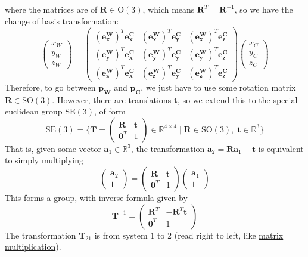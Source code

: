\documentclass{article}
\begin{document}
  where the matrices are of $\mathbf{R} \in \mathrm{O}(3)$, which means $\mathbf{R}^T = \mathbf{R}^{-1}$, so we have the change of basis transformation: 
  \begin{equation}
    \begin{pmatrix} x_W \\ y_W \\ z_W \end{pmatrix} = \begin{pmatrix} (\mathbf{e_x^W})^T \mathbf{e_x^C} & (\mathbf{e_x^W})^T \mathbf{e_y^C} & (\mathbf{e_x^W})^T \mathbf{e_z^C} \\
      (\mathbf{e_y^W})^T \mathbf{e_x^C} & (\mathbf{e_y^W})^T \mathbf{e_y^C} & (\mathbf{e_y^W})^T \mathbf{e_z^C} \\
      (\mathbf{e_z^W})^T \mathbf{e_x^C} & (\mathbf{e_z^W})^T \mathbf{e_y^C} & (\mathbf{e_z^W})^T \mathbf{e_z^C}
      \end{pmatrix} \begin{pmatrix} x_C \\ y_C \\ z_C \end{pmatrix}
  \end{equation}
  Therefore, to go between $\mathbf{p_W}$ and $\mathbf{p_C}$, we just have to use some rotation matrix $\mathbf{R} \in \mathrm{SO}(3)$. However, there are translations $\mathbf{t}$, so we extend this to the special euclidean group $\mathrm{SE}(3)$, of form 
  \begin{equation}
    \mathrm{SE}(3) = \bigg\{ \mathbf{T} = \begin{pmatrix} \mathbf{R} & \mathbf{t} \\ \mathbf{0}^T & 1 \end{pmatrix} \in \mathbb{R}^{4 \times 4} \mid \mathbf{R} \in \mathrm{SO}(3), \; \mathbf{t} \in \mathbb{R}^3 \bigg\}
  \end{equation}
  That is, given some vector $\mathbf{a}_1 \in \mathbb{R}^3$, the transformation $\mathbf{a}_2 = \mathbf{R} \mathbf{a}_1 + \mathbf{t}$ is equivalent to simply multiplying \
  \begin{equation}
    \begin{pmatrix} \mathbf{a}_2 \\ 1 \end{pmatrix} = \begin{pmatrix} \mathbf{R} & \mathbf{t} \\ \mathbf{0}^T & 1 \end{pmatrix} \begin{pmatrix} \mathbf{a}_1 \\ 1 \end{pmatrix}
  \end{equation}
  This forms a group, with inverse formula given by 
  \begin{equation}
    \mathbf{T}^{-1} = \begin{pmatrix} \mathbf{R}^T & -\mathbf{R}^T \mathbf{t} \\ \mathbf{0}^T & 1 \end{pmatrix}
  \end{equation}
  The transformation $\mathbf{T}_{21}$ is from system $1$ to $2$ (read right to left, like \hyperref[lin-def:matrix-multiplication]{matrix multiplication}). 
\end{document}
